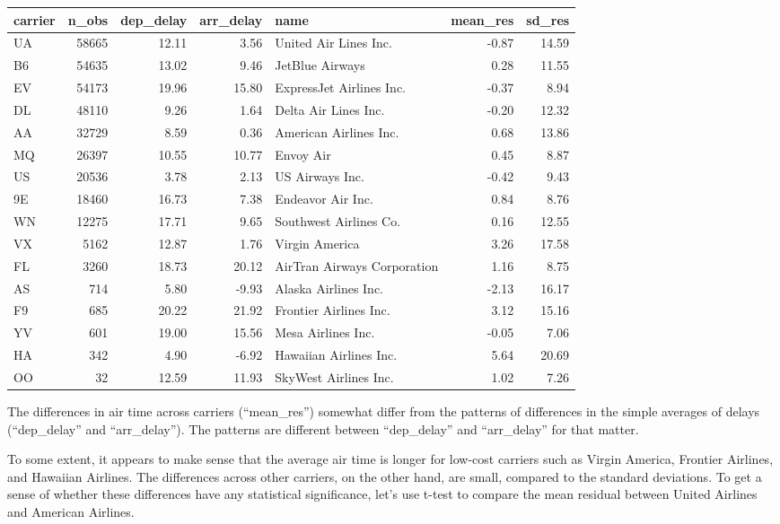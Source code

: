 \documentclass[]{book}
\theoremstyle{definition}
\theoremstyle{definition}
\theoremstyle{remark}
\begin{document}
\begin{tabular}{l|r|r|r|l|r|r}
\hline
carrier & n\_obs & dep\_delay & arr\_delay & name & mean\_res & sd\_res\\
\hline
UA & 58665 & 12.11 & 3.56 & United Air Lines Inc. & -0.87 & 14.59\\
\hline
B6 & 54635 & 13.02 & 9.46 & JetBlue Airways & 0.28 & 11.55\\
\hline
EV & 54173 & 19.96 & 15.80 & ExpressJet Airlines Inc. & -0.37 & 8.94\\
\hline
DL & 48110 & 9.26 & 1.64 & Delta Air Lines Inc. & -0.20 & 12.32\\
\hline
AA & 32729 & 8.59 & 0.36 & American Airlines Inc. & 0.68 & 13.86\\
\hline
MQ & 26397 & 10.55 & 10.77 & Envoy Air & 0.45 & 8.87\\
\hline
US & 20536 & 3.78 & 2.13 & US Airways Inc. & -0.42 & 9.43\\
\hline
9E & 18460 & 16.73 & 7.38 & Endeavor Air Inc. & 0.84 & 8.76\\
\hline
WN & 12275 & 17.71 & 9.65 & Southwest Airlines Co. & 0.16 & 12.55\\
\hline
VX & 5162 & 12.87 & 1.76 & Virgin America & 3.26 & 17.58\\
\hline
FL & 3260 & 18.73 & 20.12 & AirTran Airways Corporation & 1.16 & 8.75\\
\hline
AS & 714 & 5.80 & -9.93 & Alaska Airlines Inc. & -2.13 & 16.17\\
\hline
F9 & 685 & 20.22 & 21.92 & Frontier Airlines Inc. & 3.12 & 15.16\\
\hline
YV & 601 & 19.00 & 15.56 & Mesa Airlines Inc. & -0.05 & 7.06\\
\hline
HA & 342 & 4.90 & -6.92 & Hawaiian Airlines Inc. & 5.64 & 20.69\\
\hline
OO & 32 & 12.59 & 11.93 & SkyWest Airlines Inc. & 1.02 & 7.26\\
\hline
\end{tabular}

The differences in air time across carriers (``mean\_res'') somewhat
differ from the patterns of differences in the simple averages of delays
(``dep\_delay'' and ``arr\_delay''). The patterns are different between
``dep\_delay'' and ``arr\_delay'' for that matter.

To some extent, it appears to make sense that the average air time is
longer for low-cost carriers such as Virgin America, Frontier Airlines,
and Hawaiian Airlines. The differences across other carriers, on the
other hand, are small, compared to the standard deviations. To get a
sense of whether these differences have any statistical significance,
let's use t-test to compare the mean residual between United Airlines
and American Airlines.
\end{document}
